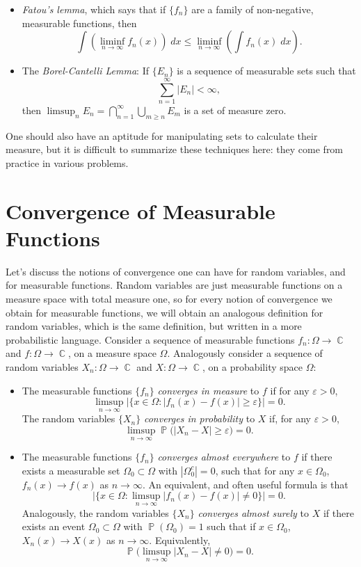 \documentclass[answers]{exam}
\DeclareMathOperator{\CC}{\mathbb{C}}
\DeclareMathOperator{\PP}{\mathbb{P}}
\begin{document}
\begin{questions}
\begin{itemize}
	\item \emph{Fatou's lemma}, which says that if $\{ f_n \}$ are a family of non-negative, measurable functions, then
	\[ \int \left( \liminf_{n \to \infty} f_n(x) \right)\; dx \leq \liminf_{n \to \infty} \left( \int f_n(x)\; dx \right). \]

	\item The \emph{Borel-Cantelli Lemma}: If $\{ E_n \}$ is a sequence of measurable sets such that
	\[ \sum_{n = 1}^\infty |E_n| < \infty, \]
	then $\limsup_n E_n = \bigcap_{n = 1}^\infty \bigcup_{m \geq n} E_m$ is a set of measure zero.
\end{itemize}
%
One should also have an aptitude for manipulating sets to calculate their measure, but it is difficult to summarize these techniques here: they come from practice in various problems.



\newpage
\section{Convergence of Measurable Functions}

Let's discuss the notions of convergence one can have for random variables, and for measurable functions. Random variables are just measurable functions on a measure space with total measure one, so for every notion of convergence we obtain for measurable functions, we will obtain an analogous definition for random variables, which is the same definition, but written in a more probabilistic language. Consider a sequence of measurable functions $f_n: \Omega \to \CC$ and $f: \Omega \to \CC$, on a measure space $\Omega$. Analogously consider a sequence of random variables $X_n: \Omega \to \CC$ and $X: \Omega \to \CC$, on a probability space $\Omega$:
%
\begin{itemize}
    \item The measurable functions $\{ f_n \}$ \emph{converges in measure} to $f$ if for any $\varepsilon > 0$,
    \[ \limsup_{n \to \infty} \Big| \{ x \in \Omega : |f_n(x) - f(x)| \geq \varepsilon \} \Big| = 0. \]
    The random variables $\{ X_n \}$ \emph{converges in probability} to $X$ if, for any $\varepsilon > 0$,
    \[ \limsup_{n \to \infty} \PP \Big( |X_n - X| \geq \varepsilon \Big) = 0. \]

    \item The measurable functions $\{ f_n \}$ \emph{converges almost everywhere} to $f$ if there exists a measurable set $\Omega_0 \subset \Omega$ with $|\Omega_0^c| = 0$, such that for any $x \in \Omega_0$, $f_n(x) \to f(x)$ as $n \to \infty$. An equivalent, and often useful formula is that
    \[ \Big| \{ x \in \Omega : \limsup_{n \to \infty} |f_n(x) - f(x)| \neq 0 \} \Big| = 0. \]
    Analogously, the random variables $\{ X_n \}$ \emph{converges almost surely} to $X$ if there exists an event $\Omega_0 \subset \Omega$ with $\PP(\Omega_0) = 1$ such that if $x \in \Omega_0$, $X_n(x) \to X(x)$ as $n \to \infty$. Equivalently,
    \[ \PP \Big( \limsup_{n \to \infty} |X_n - X| \neq 0 \Big) = 0. \]


\end{itemize}
\end{questions}
\end{document}
